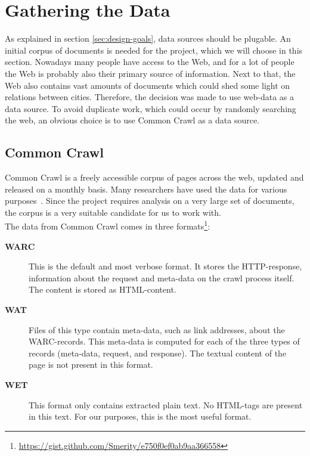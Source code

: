 \section{Gathering the Data}\label{sec:4-gathering}
As explained in section \ref{sec:design-goals}, data sources should be plugable. An initial corpus of documents is needed for the project, which we will choose in this section. Nowadays many people have access to the Web, and for a lot of people the Web is probably also their primary source of information. Next to that, the Web also contains vast amounts of documents which could shed some light on relations between cities. Therefore, the decision was made to use web-data as a data source. To avoid duplicate work, which could occur by randomly searching the web, an obvious choice is to use Common Crawl as a data source.

\subsection{Common Crawl} \label{sec:commoncrawl}
Common Crawl \cite{commoncrawl} is a freely accessible corpus of pages across the web, updated and released on a monthly basis. Many researchers have used the data for various purposes~\cite{smith2013dirt, muhleisen2012web, singh2012wikilinks}. Since the project requires analysis on a very large set of documents, the corpus is a very suitable candidate for us to work with. \\

The data from Common Crawl comes in three    formats\footnote{\url{https://gist.github.com/Smerity/e750f0ef0ab9aa366558}}: 
\begin{description}
\item[\textbf{WARC}] This is the default and most verbose format. It stores the HTTP-response, information about the request and meta-data on the crawl process itself. The content is stored as HTML-content.
\item[\textbf{WAT}] Files of this type contain meta-data, such as link addresses, about the WARC-records. This meta-data is computed for each of the three types of records (meta-data, request, and response). The textual content of the page is not present in this format.
\item[\textbf{WET}] This format only contains extracted plain text. No HTML-tags are present in this text. For our purposes, this is the most useful format.
\end{description}

